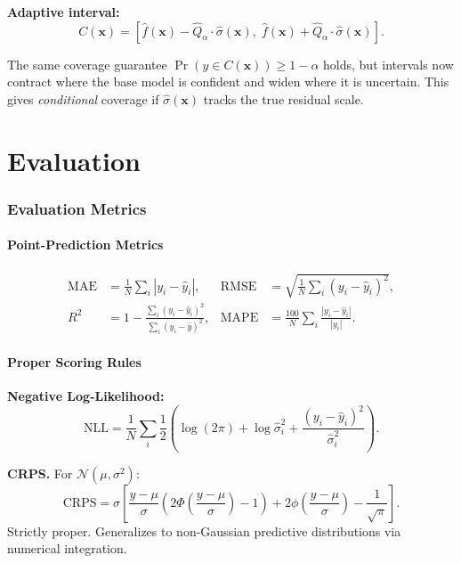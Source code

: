 \documentclass[11pt,a4paper]{article}
\theoremstyle{definition}
\newcommand{\bx}{\mathbf{x}}
\begin{document}
\textbf{Adaptive interval:}
\[
  C(\bx) = \left[\hat{f}(\bx) - \hat{Q}_\alpha \cdot \hat{\sigma}(\bx),\;
                  \hat{f}(\bx) + \hat{Q}_\alpha \cdot \hat{\sigma}(\bx)\right].
\]

The same coverage guarantee $\Pr(y \in C(\bx)) \geq 1 - \alpha$ holds, but
intervals now contract where the base model is confident and widen where
it is uncertain. This gives \emph{conditional} coverage if
$\hat{\sigma}(\bx)$ tracks the true residual scale.

\part{Evaluation}

\section{Evaluation Metrics}
\label{sec:metrics}

\subsection{Point-Prediction Metrics}

\begin{align}
  \text{MAE} &= \frac{1}{N}\sum_{i} |y_i - \hat{y}_i|, &
  \text{RMSE} &= \sqrt{\frac{1}{N}\sum_{i} (y_i - \hat{y}_i)^2}, \\
  R^2 &= 1 - \frac{\sum_i (y_i - \hat{y}_i)^2}{\sum_i (y_i - \bar{y})^2}, &
  \text{MAPE} &= \frac{100}{N}\sum_{i} \frac{|y_i - \hat{y}_i|}{|y_i|}.
\end{align}

\subsection{Proper Scoring Rules}

\textbf{Negative Log-Likelihood:}
\[
  \text{NLL} = \frac{1}{N}\sum_{i} \frac{1}{2}\left(\log(2\pi) + \log\hat{\sigma}_i^2 + \frac{(y_i - \hat{y}_i)^2}{\hat{\sigma}_i^2}\right).
\]

\textbf{CRPS.} For $\mathcal{N}(\mu, \sigma^2)$:
\begin{equation}
  \text{CRPS} = \sigma \left[
    \frac{y - \mu}{\sigma}\left(2\Phi\!\left(\frac{y-\mu}{\sigma}\right) - 1\right) +
    2\phi\!\left(\frac{y-\mu}{\sigma}\right) - \frac{1}{\sqrt{\pi}}
  \right].
  \label{eq:crps}
\end{equation}
Strictly proper. Generalizes to non-Gaussian predictive distributions via
numerical integration.
\end{document}
